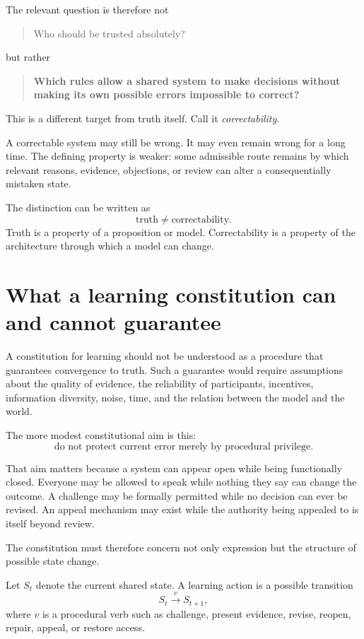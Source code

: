 \documentclass[11pt,a4paper]{article}
\begin{document}
The relevant question is therefore not
\begin{quote}
Who should be trusted absolutely?
\end{quote}
but rather
\begin{quote}
\textbf{Which rules allow a shared system to make decisions without making its own possible errors impossible to correct?}
\end{quote}

This is a different target from truth itself. Call it \emph{correctability}.

A correctable system may still be wrong. It may even remain wrong for a long time. The defining property is weaker: some admissible route remains by which relevant reasons, evidence, objections, or review can alter a consequentially mistaken state.

The distinction can be written as
\[
\boxed{\text{truth} \neq \text{correctability}.}
\]
Truth is a property of a proposition or model. Correctability is a property of the architecture through which a model can change.

\section{What a learning constitution can and cannot guarantee}

A constitution for learning should not be understood as a procedure that guarantees convergence to truth. Such a guarantee would require assumptions about the quality of evidence, the reliability of participants, incentives, information diversity, noise, time, and the relation between the model and the world.

The more modest constitutional aim is this:
\[
\boxed{\text{do not protect current error merely by procedural privilege}.}
\]

That aim matters because a system can appear open while being functionally closed. Everyone may be allowed to speak while nothing they say can change the outcome. A challenge may be formally permitted while no decision can ever be revised. An appeal mechanism may exist while the authority being appealed to is itself beyond review.

The constitution must therefore concern not only expression but the structure of possible state change.

Let $S_t$ denote the current shared state. A learning action is a possible transition
\[
S_t \xrightarrow{v} S_{t+1},
\]
where $v$ is a procedural verb such as challenge, present evidence, revise, reopen, repair, appeal, or restore access.
\end{document}
